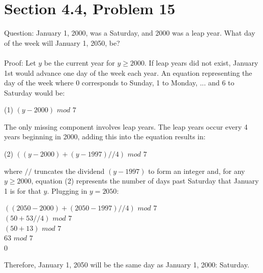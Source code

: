 \documentclass{article}
\begin{document}
\clearpage
\header

\section*{Section 4.4, Problem 15}
Question: January 1, 2000, was a Saturday, and 2000 was a leap year. What day of the week will January 1, 2050, be?
\\\\
Proof: Let $y$ be the current year for $y\geq2000$. If leap years did not exist, January 1st would advance one day of the week each year. An equation representing the day of the week where 0 corresponds to Sunday, 1 to Monday, ... and 6 to Saturday would be:
\begin{center}
	(1) $(y-2000)$ $mod$ $7$
\end{center}
The only missing component involves leap years. The leap years occur every 4 years beginning in 2000, adding this into the equation results in:
\begin{center}
	(2) $((y-2000) + (y-1997)//4)$ $mod$ $7$
\end{center}
where $//$ truncates the dividend $(y-1997)$ to form an integer and, for any $y\geq2000$, equation (2) represents the number of days past Saturday that January 1 is for that $y$. Plugging in $y=2050$:
\begin{center}
	$((2050-2000) + (2050-1997)//4)$ $mod$ $7$\\
	$(50 + 53//4)$ $mod$ $7$\\
	$(50 + 13)$ $mod$ $7$\\
	$63$ $mod$ $7$\\
	$0$
\end{center}
Therefore, January 1, 2050 will be the same day as January 1, 2000: Saturday.

\clearpage
\header
\end{document}
